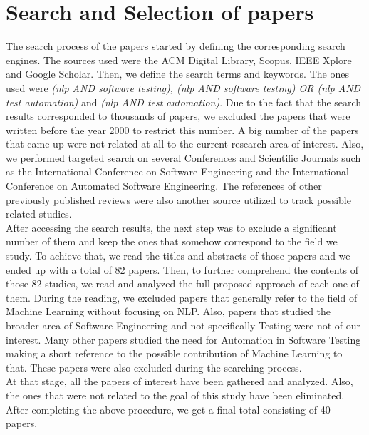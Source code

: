 \section*{Search and Selection of papers}
The search process of the papers started by defining the corresponding search engines. The sources used were the ACM Digital Library, Scopus, 
IEEE Xplore and Google Scholar. Then, we define the search terms and keywords. The ones used were \emph{(nlp AND software testing), (nlp 
AND software testing) OR (nlp AND test automation)} and \emph{(nlp AND test automation)}. Due to the fact that the search results corresponded 
to thousands of papers, we excluded the papers that were written before the year 2000 to restrict this number. A big number of the papers that came up 
were not related at all to the current research area of interest. Also, we performed targeted search on several Conferences and Scientific Journals such 
as the International Conference on Software Engineering and the International Conference on Automated Software Engineering. The references of other previously 
published reviews were also another source utilized to track possible related studies. \\

After accessing the search results, the next step was to exclude a significant number of them and keep the ones that somehow correspond to the field we study. 
To achieve that, we read the titles and abstracts of those papers and we ended up with a total of 82 papers. Then, to further comprehend the contents of those 82 studies, 
we read and analyzed the full proposed approach of each one of them. During the reading, we excluded papers that generally refer to the field of 
Machine Learning without focusing on NLP. Also, papers that studied the broader area of Software Engineering and not specifically Testing were not 
of our interest. Many other papers studied the need for Automation in Software Testing making a short reference to the possible contribution of Machine 
Learning to that. These papers were also excluded during the searching process. \\

At that stage, all the papers of interest have been gathered and analyzed. Also, the ones that were not related to the goal of this study have been 
eliminated. After completing the above procedure, we get a final total consisting of 40 papers. 